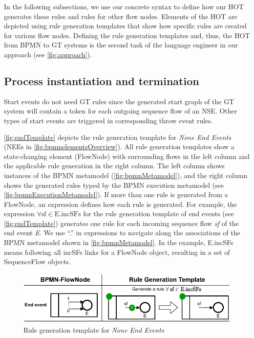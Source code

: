\documentclass{lmcs} %
\begin{document}
In the following subsections, we use our concrete syntax to define how our HOT generates these rules and rules for other flow nodes.
Elements of the HOT are depicted using rule generation templates that show how specific rules are created for various flow nodes.
Defining the rule generation templates and, thus, the HOT from BPMN to GT systems is the second task of the language engineer in our approach (see \autoref{fig:approach}).

\subsection{Process instantiation and termination} \label{subsec:instAndTermination}

Start events do not need GT rules since the generated start graph of the GT system will contain a token for each outgoing sequence flow of an NSE.
Other types of start events are triggered in corresponding throw event rules.

\autoref{fig:endTemplate} depicts the rule generation template for \textit{None End Events} (\textsf{NEE}s in \autoref{fig:bpmnelementsOverview}).
All rule generation templates show a state-changing element (\textsf{FlowNode}) with surrounding flows in the left column and the applicable rule generation in the right column.
The left column shows instances of the BPMN metamodel (\autoref{fig:bpmnMetamodel}), and the right column shows the generated rules typed by the BPMN execution metamodel (see \autoref{fig:bpmnExecutionMetamodel}).
If more than one rule is generated from a \textsf{FlowNode}, an expression defines how each rule is generated.
For example, the expression $\forall \text{sf} \in \text{E.incSFs}$ for the rule generation template of end events (see \autoref{fig:endTemplate}) generates one rule for each incoming sequence flow \textit{sf} of the end event \textit{E}.
We use ``.'' in expressions to navigate along the associations of the BPMN metamodel shown in \autoref{fig:bpmnMetamodel}.
In the example, \textsf{E.incSFs} means following all \textsf{incSFs} links for a \textsf{FlowNode} object, resulting in a set of \textsf{SequenceFlow} objects.

\begin{figure}[ht]
    \centering
    \includegraphics[width=.8\textwidth]{images/end_template.pdf}
    \caption{Rule generation template for \textit{None End Events}}
    \label{fig:endTemplate}
\end{figure}
    
\end{document}
